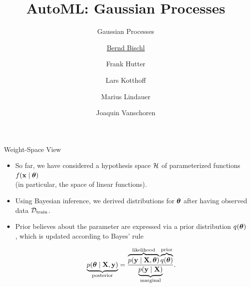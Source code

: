 


\newcommand{\lz}{\vspace{0.5cm}}
\newcommand{\thetab}{\bm{\weights}}
\newcommand{\zero}{\mathbf{0}}
\newcommand{\Xmat}{\mathbf{X}}
\newcommand{\ydat}{\mathbf{y}}
\newcommand{\id}{\boldsymbol{I}}
\newcommand{\Amat}{\mathbf{A}}
\newcommand{\Xspace}{\mathcal{X}}                                           
\newcommand{\Yspace}{\mathcal{Y}}
\newcommand{\ls}{\ell}
\newcommand{\natnum}{\mathbb{N}}
\newcommand{\intnum}{\mathbb{Z}}

\usepackage{fontawesome}
\usepackage{dirtytalk}
\usepackage{csquotes}


\title[AutoML: GPs]{AutoML: Gaussian Processes} %
\subtitle{Gaussian Processes} %
\author[Marius Lindauer]{\underline{Bernd Bischl} \and Frank Hutter \and Lars Kotthoff\newline \and Marius Lindauer \and Joaquin Vanschoren}
\institute{}
\date{}





	
	\maketitle
	

\begin{frame}[c]{Weight-Space View}

\begin{itemize}
  \item So far, we have considered a hypothesis space $\mathcal{H}$ of parameterized functions $f(\x\mid\thetab)$ \\(in particular, the space of linear functions). 
  \lz
  \item Using Bayesian inference, we derived distributions for $\thetab$ after having observed data $\mathcal{D}_{\text{train}}$.
  \lz
  \item Prior believes about the parameter are expressed via a prior distribution $q(\thetab)$, which is updated according to Bayes' rule 

$$
\underbrace{p(\thetab \mid \Xmat, \ydat)}_{\text{posterior}} = \frac{\overbrace{p(\ydat \mid \Xmat, \thetab)}^{\text{likelihood}}\overbrace{q(\thetab)}^{\text{prior}}}{\underbrace{p(\ydat\mid\Xmat)}_{\text{marginal}}}.
$$
\end{itemize}

\end{frame}



